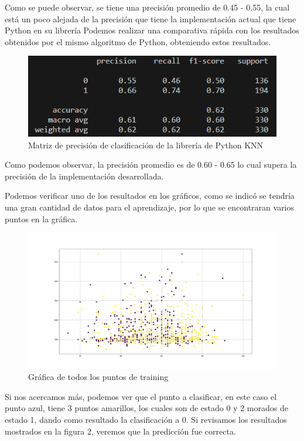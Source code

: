 \documentclass[12pt]{article} %
\begin{document}
Como se puede observar, se tiene una precisión promedio de 0.45 - 0.55, la cual está un poco alejada de la precisión que tiene la implementación actual que tiene Python en su librería
Podemos realizar una comparativa rápida con los resultados obtenidos por el mismo algoritmo de Python, obteniendo estos resultados.

\begin{figure}[H]
\centering
\includegraphics[width=\textwidth]{metricas2}
\caption{Matriz de precisión de clasificación de la librería de Python KNN}
\end{figure}

Como podemos observar, la precisión promedio es de 0.60 - 0.65 lo cual supera la precisión de la implementación desarrollada.

Podemos verificar uno de los resultados en los gráficos, como se indicó se tendría una gran cantidad de datos para el aprendizaje, por lo que se encontraran varios puntos en la gráfica.

\begin{figure}[H]
\centering
\includegraphics[width=\textwidth]{grafica1}
\caption{Gráfica de todos los puntos de training}
\end{figure}

Si nos acercamos más, podemos ver que el punto a clasificar, en este caso el punto azul, tiene 3 puntos amarillos, los cuales son de estado 0 y 2 morados de estado 1,
dando como resultado la clasificación a 0. Si revisamos los resultados mostrados en la figura 2, veremos que la predicción fue correcta.
\end{document}
